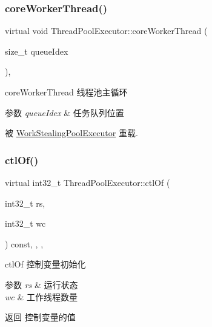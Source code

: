 \subsubsection{\texorpdfstring{core\+Worker\+Thread()}{coreWorkerThread()}}
{\footnotesize\ttfamily virtual void Thread\+Pool\+Executor\+::core\+Worker\+Thread (\begin{DoxyParamCaption}\item[{size\+\_\+t}]{queue\+Idex }\end{DoxyParamCaption})\hspace{0.3cm}{\ttfamily [protected]}, {\ttfamily [virtual]}}



core\+Worker\+Thread 线程池主循环 


\begin{DoxyParams}{参数}
{\em queue\+Idex} & 任务队列位置 \\
\hline
\end{DoxyParams}


被 \hyperlink{classWorkStealingPoolExecutor_ae0445ee114ceec03cf9513c394df7c89}{Work\+Stealing\+Pool\+Executor} 重载.

\mbox{\label{classThreadPoolExecutor_a31ed7a73571c79c8dbb486f27a4df4eb}} 
\subsubsection{\texorpdfstring{ctl\+Of()}{ctlOf()}}
{\footnotesize\ttfamily virtual int32\+\_\+t Thread\+Pool\+Executor\+::ctl\+Of (\begin{DoxyParamCaption}\item[{int32\+\_\+t}]{rs,  }\item[{int32\+\_\+t}]{wc }\end{DoxyParamCaption}) const\hspace{0.3cm}{\ttfamily [inline]}, {\ttfamily [final]}, {\ttfamily [protected]}, {\ttfamily [virtual]}}



ctl\+Of 控制变量初始化 


\begin{DoxyParams}{参数}
{\em rs} & 运行状态 \\
\hline
{\em wc} & 工作线程数量\\
\hline
\end{DoxyParams}
\begin{DoxyReturn}{返回}
控制变量的值 
\end{DoxyReturn}
\mbox{\label{classThreadPoolExecutor_a4dac3c2435919af5d77aa36069d35bc7}} 
